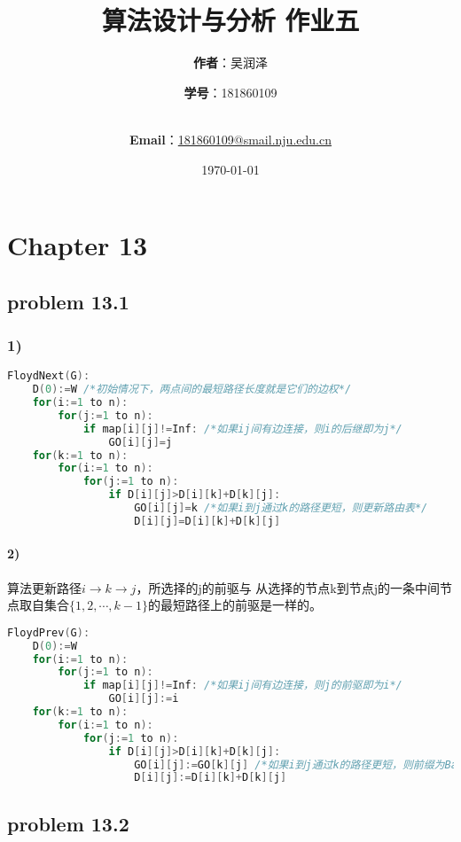 \documentclass[11pt,a4paper,oneside,oldfontcommands]{ctexart}
\title{\Huge\textbf{算法设计与分析 作业五}\\}
\author{\Large\textbf{作者}：吴润泽 \and{\Large\textbf{学号}：181860109}\\
	\\
	\and {\Large\textbf{Email}：\href{mailto:181860109@smail.nju.edu.cn}{181860109@smail.nju.edu.cn}}\\}
\date{\Large\today}
\begin{document}
\maketitle

\tableofcontents
\cleardoublepage
\section*{Chapter 13}
{\subsection*{problem 13.1}}
\subsubsection*{1)}
\begin{lstlisting}[language=C++,title=FloydNext.func]
FloydNext(G):
	D(0):=W /*初始情况下，两点间的最短路径长度就是它们的边权*/
	for(i:=1 to n):
		for(j:=1 to n):
			if map[i][j]!=Inf: /*如果ij间有边连接，则i的后继即为j*/
				GO[i][j]=j
	for(k:=1 to n):
		for(i:=1 to n):
			for(j:=1 to n):
				if D[i][j]>D[i][k]+D[k][j]:
					GO[i][j]=k /*如果i到j通过k的路径更短，则更新路由表*/
					D[i][j]=D[i][k]+D[k][j]
\end{lstlisting}
\paragraph*{2)}
算法更新路径$i \rightarrow k \rightarrow j$，所选择的j的前驱与
从选择的节点k到节点j的一条中间节点取自集合$\{1,2,\cdots,k-1\}$的最短路径上的前驱是一样的。

\begin{lstlisting}[language=C++,title=FloydPrev.func]
FloydPrev(G):
	D(0):=W
	for(i:=1 to n):
		for(j:=1 to n):
			if map[i][j]!=Inf: /*如果ij间有边连接，则j的前驱即为i*/
				GO[i][j]:=i
	for(k:=1 to n):
		for(i:=1 to n):
			for(j:=1 to n):
				if D[i][j]>D[i][k]+D[k][j]:
					GO[i][j]:=GO[k][j] /*如果i到j通过k的路径更短，则前缀为Back[k][j]*/
					D[i][j]:=D[i][k]+D[k][j]
\end{lstlisting}
{\subsection*{problem 13.2}}
\end{document}
